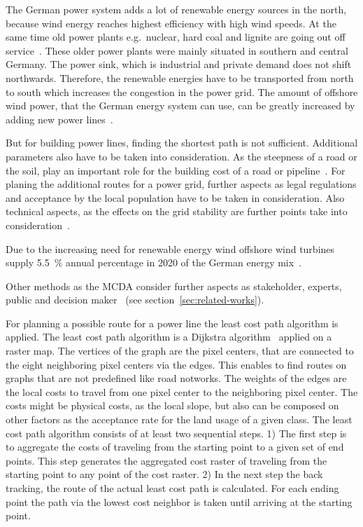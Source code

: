 \documentclass[acmtog]{acmart}
\begin{document}
	The German power system adds a lot of renewable energy sources in the north, because wind energy reaches highest efficiency with high wind speeds.
	At the same time old power plants e.g.\ nuclear, hard coal and lignite are going out off service~\cite{eser-frey_analyzing_2012}.
	These older power plants were mainly situated in southern and central Germany. 
	The power sink, which is industrial and private demand does not shift northwards.
	Therefore, the renewable energies have to be transported from north to south which increases the congestion in the power grid. 
	The amount of offshore wind power, that the German energy system can use, can be greatly increased by adding new power lines~\cite{leuthold_nodal_2005}.
	
	But for building power lines, finding the shortest path is not sufficient.
	Additional parameters also have to be taken into consideration.
	As the steepness of a road or the soil, play an important role for the building cost of a road or pipeline~\cite{suleiman_optimal_2015}.
	For planing the additional routes for a power grid, further aspects as legal regulations and acceptance
	by the local population have to be taken in consideration.
	Also technical aspects, as the effects on the grid stability are further points take into consideration~\cite{schafer_understanding_2022}.
	
	Due to the increasing need for renewable energy wind offshore wind turbines supply 5.5~\% annual percentage in 2020 of the German energy mix~\cite{noauthor_nettostromerzeugung_2021}.

	Other methods as the \acrfull{MCDA}  consider further aspects as stakeholder, experts, public and decision maker~\cite{bertsch_participatory_2016} (see section~\ref{sec:related-works}).
	
	For planning a possible route for a power line the least cost path algorithm is applied.
	The least cost path algorithm is a Dijkstra algorithm~\cite{dijkstra_note_1959} applied on a raster map.
	The vertices of the graph are the pixel centers, that are connected to the eight neighboring pixel centers via the edges.
	This enables to find routes on graphs that are not predefined like road notworks.
	The weights of the edges are the local costs to travel from one pixel center to the neighboring pixel center.
	The costs might be physical costs, as the local slope, but also can be composed on other factors as the acceptance rate for the land usage of a given class.
	The least cost path algorithm consists of at least two sequential steps.
	1) The first step is to aggregate the costs of traveling from the starting point to a given set of end points.
	This step generates the aggregated cost raster of traveling from the starting point to any point of the cost raster.
	2) In the next step the back tracking, the route of the actual least cost path is calculated.
	For each ending point the path via the lowest cost neighbor is taken until arriving at the starting point.
	
\end{document}
